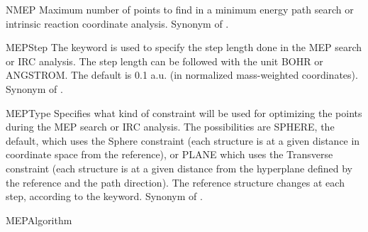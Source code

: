 \begin{keywordlist}
\item[NMEP]
Maximum number of points to find in a minimum energy path search or intrinsic reaction coordinate analysis.
Synonym of .
\item[MEPStep]
The keyword is used to specify the step length done in the MEP search or IRC analysis.
The step length can be followed with the unit BOHR or ANGSTROM. The default is 0.1 a.u.
(in normalized mass-weighted coordinates).
Synonym of .
\item[MEPType]
Specifies what kind of constraint will be used for optimizing the points during the MEP search or IRC analysis.
The possibilities are SPHERE, the default, which uses the Sphere constraint (each structure is at a given distance in coordinate space from the reference),
or PLANE which uses the Transverse constraint (each structure is at a given distance from the hyperplane defined by the reference and the path direction).
The reference structure changes at each step, according to the  keyword.
Synonym of .
\item[MEPAlgorithm]

\end{keywordlist}
